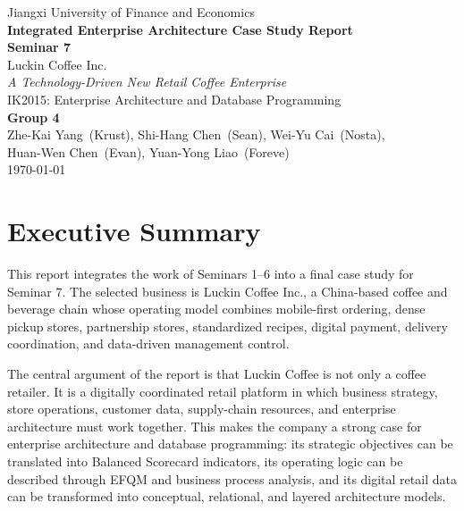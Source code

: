 \documentclass[12pt,a4paper]{article}
\title{}
\author{}
\date{}
\begin{document}
\thispagestyle{empty}
\vspace*{1.7cm}

\begin{center}
  {\normalsize Jiangxi University of Finance and Economics} \\[2.0cm]

  {\LARGE\bfseries Integrated Enterprise Architecture Case Study Report} \\[0.25cm]
  {\Large\bfseries Seminar 7} \\[1.0cm]

  {\Large Luckin Coffee Inc.} \\[0.25cm]
  {\normalsize\itshape A Technology-Driven New Retail Coffee Enterprise} \\[2.0cm]

  {\normalsize IK2015: Enterprise Architecture and Database Programming} \\[2.1cm]

  {\normalsize\textbf{Group 4}} \\[0.45cm]
  {\normalsize
    Zhe-Kai Yang~(Krust),\quad
    Shi-Hang Chen~(Sean),\quad
    Wei-Yu Cai~(Nosta), \\[0.2cm]
    Huan-Wen Chen~(Evan),\quad
    Yuan-Yong Liao~(Foreve)
  } \\[1.7cm]

  {\normalsize \today}
\end{center}

\newpage
\hypersetup{pageanchor=true}
\setcounter{page}{1}
\pagestyle{fancy}

\tableofcontents
\newpage

\section{Executive Summary}

This report integrates the work of Seminars 1--6 into a final case study for Seminar 7. The selected business is Luckin Coffee Inc., a China-based coffee and beverage chain whose operating model combines mobile-first ordering, dense pickup stores, partnership stores, standardized recipes, digital payment, delivery coordination, and data-driven management control.

The central argument of the report is that Luckin Coffee is not only a coffee retailer. It is a digitally coordinated retail platform in which business strategy, store operations, customer data, supply-chain resources, and enterprise architecture must work together. This makes the company a strong case for enterprise architecture and database programming: its strategic objectives can be translated into Balanced Scorecard indicators, its operating logic can be described through EFQM and business process analysis, and its digital retail data can be transformed into conceptual, relational, and layered architecture models.
\end{document}
